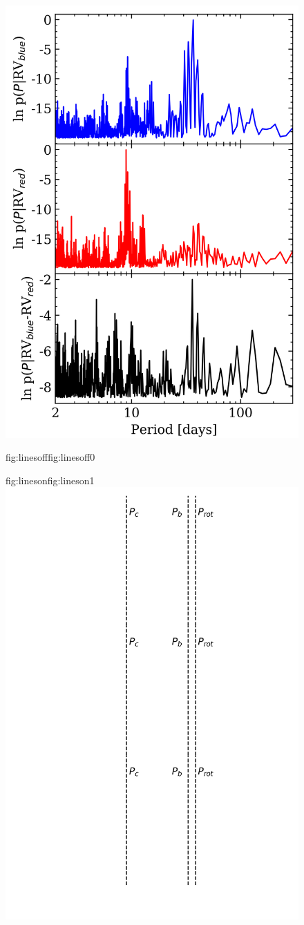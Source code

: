 \begin{figure}
  \centering
  \includegraphics[width=0.6\hsize]{figures/glsp_bluereddiff_bkgd.png}%
  \hspace{-0.6\hsize}%
  \begin{ocg}{fig:linesoff}{fig:linesoff}{0}%
  \end{ocg}%
  \begin{ocg}{fig:lineson}{fig:lineson}{1}%
  \includegraphics[width=0.6\hsize]{figures/glsp_bluereddiff_lines.png}%

\end{ocg}
\end{figure}

